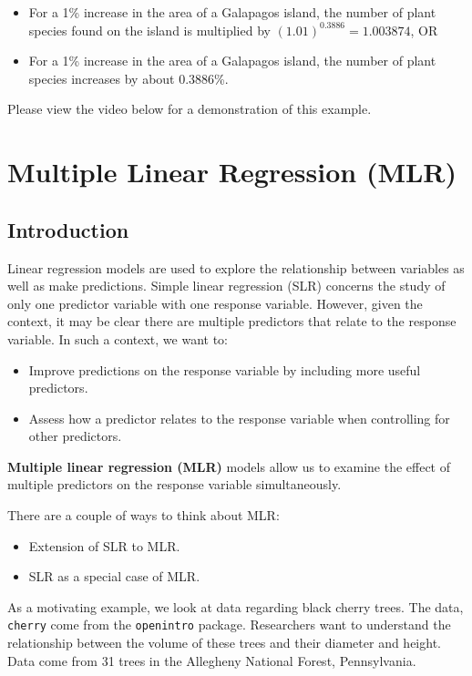 \documentclass[
]{book}
\providecommand{\tightlist}{%
  \setlength{\itemsep}{0pt}\setlength{\parskip}{0pt}}
\begin{document}
\begin{itemize}
\item
  For a 1\% increase in the area of a Galapagos island, the number of plant species found on the island is multiplied by \((1.01)^{0.3886} = 1.003874\), OR
\item
  For a 1\% increase in the area of a Galapagos island, the number of plant species increases by about 0.3886\%.
\end{itemize}

Please view the video below for a demonstration of this example.

\hypertarget{mlr}{%
\chapter{Multiple Linear Regression (MLR)}\label{mlr}}

\hypertarget{introduction-5}{%
\section{Introduction}\label{introduction-5}}

Linear regression models are used to explore the relationship between variables as well as make predictions. Simple linear regression (SLR) concerns the study of only one predictor variable with one response variable. However, given the context, it may be clear there are multiple predictors that relate to the response variable. In such a context, we want to:

\begin{itemize}
\tightlist
\item
  Improve predictions on the response variable by including more useful predictors.
\item
  Assess how a predictor relates to the response variable when controlling for other predictors.
\end{itemize}

\textbf{Multiple linear regression (MLR)} models allow us to examine the effect of multiple predictors on the response variable simultaneously.

There are a couple of ways to think about MLR:

\begin{itemize}
\tightlist
\item
  Extension of SLR to MLR.
\item
  SLR as a special case of MLR.
\end{itemize}

As a motivating example, we look at data regarding black cherry trees. The data, \texttt{cherry} come from the \texttt{openintro} package. Researchers want to understand the relationship between the volume of these trees and their diameter and height. Data come from 31 trees in the Allegheny National Forest, Pennsylvania.
\end{document}
